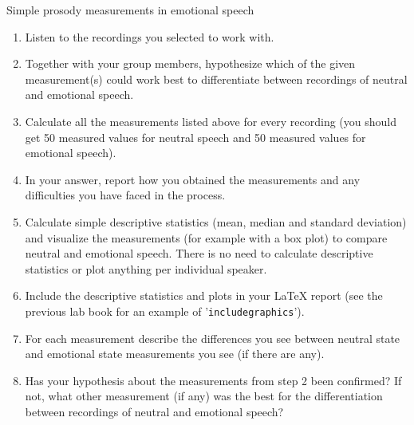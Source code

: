 \documentclass{../labbook}
\begin{document}
\begin{problem}{1}{10}{Simple prosody measurements in emotional speech}
\begin{enumerate}
    \item Listen to the recordings you selected to work with. 
    \item Together with your group members, hypothesize which of the given measurement(s) could work best to differentiate between recordings of neutral and emotional speech.
    \item Calculate all the measurements listed above for every recording (you should get 50 measured values for neutral speech and 50 measured values for emotional speech).
    \item In your answer, report how you obtained the measurements and any difficulties you have faced in the process.
    \item Calculate simple descriptive statistics (mean, median and standard deviation) and visualize the measurements (for example with a box plot) to compare neutral and emotional speech. There is no need to calculate descriptive statistics or plot anything per individual speaker.
    \item Include the descriptive statistics and plots in your LaTeX report (see the previous lab book for an example of '\texttt{includegraphics}').
    \item For each measurement describe the differences you see between neutral state and emotional state measurements you see (if there are any).
    \item Has your hypothesis about the measurements from step 2 been confirmed? If not, what other measurement (if any) was the best for the differentiation between recordings of neutral and emotional speech?
\end{enumerate}

\end{problem}
\end{document}
